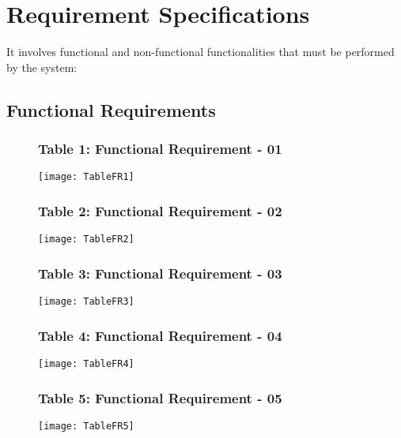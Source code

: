 \section{Requirement Specifications}
It involves functional and non-functional functionalities that must be performed by the system:

\subsection{Functional Requirements}

\begin{figure}[ht]
\subsubsection{Table 1: Functional Requirement - 01}
\centering
\texttt{[image: TableFR1]}
\end{figure}

\begin{figure}[ht]
\subsubsection{Table 2: Functional Requirement - 02}
\centering
\texttt{[image: TableFR2]}
\end{figure}

\begin{figure}[ht]
\subsubsection{Table 3: Functional Requirement - 03}
\centering
\texttt{[image: TableFR3]}
\end{figure}

\begin{figure}[ht]
\subsubsection{Table 4: Functional Requirement - 04}
\centering
\texttt{[image: TableFR4]}
\end{figure}

\begin{figure}[ht]
\subsubsection{Table 5: Functional Requirement - 05}
\centering
\texttt{[image: TableFR5]}
\end{figure}

